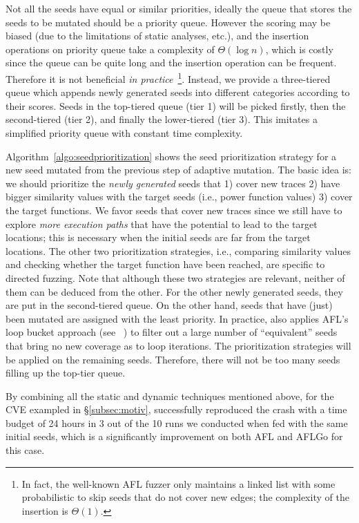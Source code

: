  Not all the seeds have equal or similar priorities, ideally the queue that stores the seeds to be mutated should be a priority queue. However the scoring may be biased (due to the limitations of static analyses, etc.), and the insertion operations on priority queue take a complexity of $\Theta(\log n)$, which is costly since the queue can be quite long and the insertion operation can be frequent. Therefore it is not beneficial \emph{in practice}~\footnote{In fact, the well-known AFL fuzzer only maintains a linked list with some probabilistic to skip seeds that do not cover new edges; the complexity of the  insertion  is $\Theta(1)$.}. Instead, we provide a three-tiered queue which appends newly generated seeds into different categories according to their scores. Seeds in the top-tiered queue (tier 1) will be picked firstly, then the second-tiered (tier 2), and finally the lower-tiered (tier 3). This imitates a simplified priority queue with constant time complexity.
 
 
 Algorithm~\ref{algo:seedprioritization} shows the seed prioritization strategy for a new seed mutated from the previous step of adaptive mutation. The basic idea is: we should prioritize the \emph{newly generated} seeds that 1) cover new traces 2) have bigger similarity values with the target seeds (i.e., power function values) 3) cover the target functions. We favor seeds that cover new traces since we still have to explore \emph{more execution paths} that have the potential to lead to the target locations; this is necessary when the initial seeds are far from the target locations. The other two prioritization strategies, i.e., comparing similarity values and checking whether the target function have been reached, are specific to directed fuzzing. Note that although these two strategies are relevant, neither of them can be deduced from the other. For the other newly generated seeds, they are put in the second-tiered queue. On the other hand, seeds that have (just) been mutated are assigned with the least priority.
In practice, \dFOT also applies AFL's loop bucket approach (see ~\cite{afl_detail}) to filter out a large number of ``equivalent'' seeds that bring no new coverage as to loop iterations. The prioritization strategies will be applied on the remaining seeds. Therefore, there will not be too many seeds filling up the top-tier queue.

By combining all the static and dynamic techniques mentioned above, for the CVE exampled in \S\ref{subsec:motiv}, \dFOT successfully reproduced the crash with a time budget of 24 hours in 3 out of the 10 runs we conducted when fed with the same initial seeds, which is a significantly improvement on both AFL and AFLGo for this case.
 




